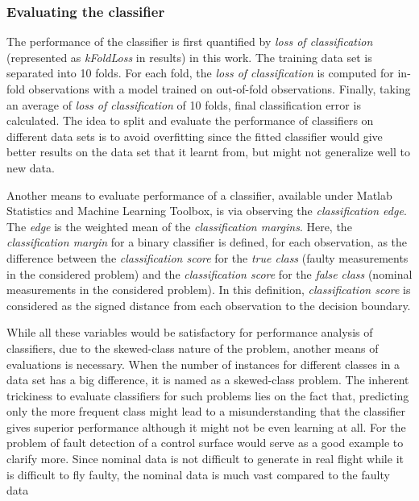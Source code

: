 \subsubsection{Evaluating the classifier}
\label{evalClassifier}

The performance of the classifier is first quantified by \emph{loss of classification} (represented as \emph{kFoldLoss} in results) in this work. 
The training data set is separated into 10 folds. For each fold, the \emph{loss of classification} is computed for in-fold observations with a model trained on out-of-fold observations. 
Finally, taking an average of \emph{loss of classification} of 10 folds, final classification error is calculated.
The idea to split and evaluate the performance of classifiers on different data sets is to avoid overfitting since the fitted classifier would give better results on the data set that it learnt from, but might not generalize well to new data. 

Another means to evaluate performance of a classifier, available under Matlab Statistics and Machine Learning Toolbox, is via observing the \emph{classification edge}. 
The \emph{edge} is the weighted mean of the \emph{classification margins}. 
Here, the \emph{classification margin} for a binary classifier is defined, for each observation, as the difference between the \emph{classification score} for the \emph{true class} (faulty measurements in the considered problem) and the \emph{classification score} for the \emph{false class} (nominal measurements in the considered problem). 
In this definition, \emph{classification score} is considered as the signed distance from each observation to the decision boundary.

While all these variables would be satisfactory for performance analysis of classifiers, due to the skewed-class nature of the problem, another means of evaluations is necessary.
When the number of instances for different classes in a data set has a big difference, it is named as a skewed-class problem. 
The inherent trickiness to evaluate classifiers for such problems lies on the fact that, predicting only the more frequent class might lead to a misunderstanding that the classifier gives superior performance although it might not be even learning at all. 
For the problem of fault detection of a control surface would serve as a good example to clarify more. 
Since nominal data is not difficult to generate in real flight while it is difficult to fly faulty, the nominal data is much vast compared to the faulty data 

